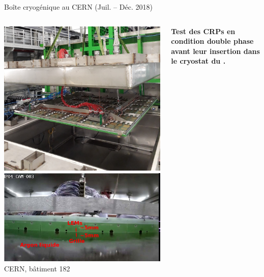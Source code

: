     \begin{frame}{Boîte cryogénique au CERN (Juil. -- Déc. 2018)}
   		\begin{columns}
   			\begin{column}{0.4\textwidth}
   				\includegraphics[width=\textwidth]{./pictures/crp_inserting_coldbox.png}\\
   				\includegraphics[width=\textwidth]{./pictures/in_coldbox.png}\\
   				CERN, bâtiment 182
    		\end{column}
    		\begin{column}{0.6\textwidth}
    			\begin{scriptsize}
	    			\textbf{Test des CRPs en condition double phase avant leur insertion dans le cryostat du \SSS{}.}\\
	    			

\end{scriptsize}
\end{column}
\end{columns}
\end{frame}

